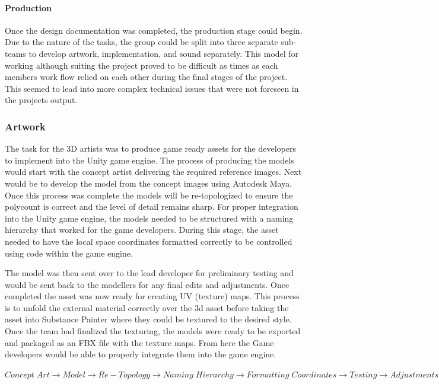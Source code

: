 \documentclass[12pt]{article}
\begin{document}
\paragraph{Production}

Once the design documentation was completed, the production stage could begin. Due to the nature of the tasks, the group could be split into three separate sub-teams to develop artwork, implementation, and sound separately. This model for working although suiting the project proved to be difficult as times as each members work flow relied on each other during the final stages of the project. This seemed to lead into more complex technical issues that were not foreseen in the projects output.

\subsubsection{Artwork}

The task for the 3D artists was to produce game ready assets for the developers to implement into the Unity game engine. The process of producing the models would start with the concept artist delivering the required reference images. Next would be to develop the model from the concept images using Autodesk Maya. Once this process was complete the models will be re-topologized to ensure the polycount is correct and the level of detail remains sharp. For proper integration into the Unity game engine, the models needed to be structured with a naming hierarchy that worked for the game developers. During this stage, the asset needed to have the local space coordinates formatted correctly to be controlled using code within the game engine. 

The model was then sent over to the lead developer for preliminary testing and would be sent back to the modellers for any final edits and adjustments. Once completed the asset was now ready for creating UV (texture) maps. This process is to unfold the external material correctly over the 3d asset before taking the asset into Substance Painter where they could be textured to the desired style. 
Once the team had finalized the texturing, the models were ready to be exported and packaged as an FBX file with the texture maps. From here the Game developers would be able to properly integrate them into the game engine.

\begin{center}
	$ Concept \; Art \rightarrow Model \rightarrow Re-Topology \rightarrow Naming \; Hierarchy \rightarrow Formatting \; Coordinates \rightarrow Testing \rightarrow Adjustments \; Edits \rightarrow UVing \rightarrow Texturing \rightarrow Exporting \rightarrow Game \; Ready $
\end{center}
\end{document}
